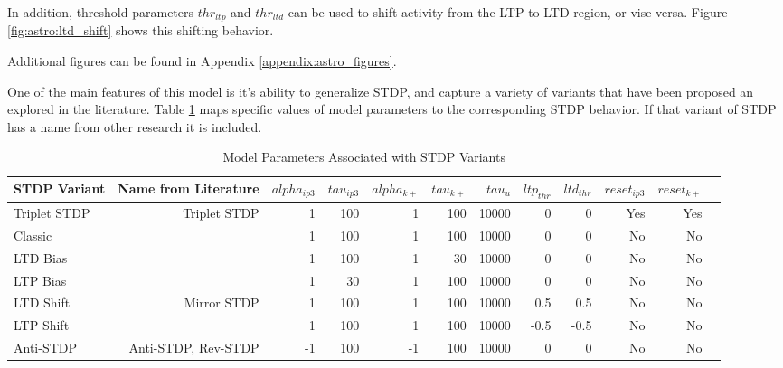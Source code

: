 
    In addition, threshold parameters $thr_{ltp}$ and $thr_{ltd}$ can be used to
    shift activity from the LTP to LTD region, or vise versa. Figure
    \ref{fig:astro:ltd_shift} shows this shifting behavior.
    

    Additional figures can be found in Appendix \ref{appendix:astro_figures}.

    One of the main features of this model is it's ability to generalize STDP,
    and capture a variety of variants that have been proposed an explored in the
    literature. Table \ref{table:astro_varient_params} maps specific values of
    model parameters to the corresponding STDP behavior. If that
    variant of STDP has a name from other research it is included.

    \begin{table}[!htp]\centering
      \caption{Model Parameters Associated with STDP Variants} \label{table:astro_varient_params}
      \scriptsize
      \begin{tabular}{lrrrrrrrrrrr}\toprule
        STDP Variant &Name from Literature &$alpha_{ip3}$ &$tau_{ip3}$ &$alpha_{k+}$ &$tau_{k+}$ &$tau_u$ &$ltp_{thr}$ &$ltd_{thr}$ &$reset_{ip3}$ &$reset_{k+}$ \\\midrule
        Triplet STDP &Triplet STDP &1 &100 &1 &100 &10000 &0 &0 &Yes &Yes \\
        Classic & &1 &100 &1 &100 &10000 &0 &0 &No &No \\
        LTD Bias & &1 &100 &1 &30 &10000 &0 &0 &No &No \\
        LTP Bias & &1 &30 &1 &100 &10000 &0 &0 &No &No \\
        LTD Shift &Mirror STDP &1 &100 &1 &100 &10000 &0.5 &0.5 &No &No \\
        LTP Shift & &1 &100 &1 &100 &10000 &-0.5 &-0.5 &No &No \\
        Anti-STDP &Anti-STDP, Rev-STDP &-1 &100 &-1 &100 &10000 &0 &0 &No &No \\
        \bottomrule
      \end{tabular}
    \end{table}
    
